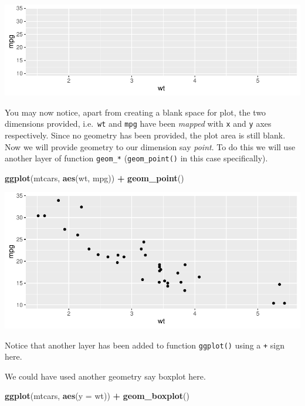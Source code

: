 \documentclass[
]{book}
\newenvironment{Shaded}{\begin{snugshade}}{\end{snugshade}}
\newcommand{\AttributeTok}[1]{\textcolor[rgb]{0.13,0.29,0.53}{#1}}
\newcommand{\FunctionTok}[1]{\textcolor[rgb]{0.13,0.29,0.53}{\textbf{#1}}}
\newcommand{\NormalTok}[1]{#1}
\newcommand{\SpecialCharTok}[1]{\textcolor[rgb]{0.81,0.36,0.00}{\textbf{#1}}}
\begin{document}
\begin{center}\includegraphics{DauR_files/figure-latex/fig_gg_2-1} \end{center}

You may now notice, apart from creating a blank space for plot, the two dimensions provided, i.e.~\texttt{wt} and \texttt{mpg} have been \emph{mapped} with \texttt{x} and \texttt{y} axes respectively. Since no geometry has been provided, the plot area is still blank. Now we will provide geometry to our dimension say \emph{point}. To do this we will use another layer of function \texttt{geom\_*} (\texttt{geom\_point()} in this case specifically).

\begin{Shaded}
\begin{Highlighting}[]
\FunctionTok{ggplot}\NormalTok{(mtcars, }\FunctionTok{aes}\NormalTok{(wt, mpg)) }\SpecialCharTok{+}
  \FunctionTok{geom\_point}\NormalTok{()}
\end{Highlighting}
\end{Shaded}

\begin{center}\includegraphics{DauR_files/figure-latex/fig_3-1} \end{center}

Notice that another layer has been added to function \texttt{ggplot()} using a \texttt{+} sign here.

We could have used another geometry say boxplot here.

\begin{Shaded}
\begin{Highlighting}[]
\FunctionTok{ggplot}\NormalTok{(mtcars, }\FunctionTok{aes}\NormalTok{(}\AttributeTok{y =}\NormalTok{ wt)) }\SpecialCharTok{+}
  \FunctionTok{geom\_boxplot}\NormalTok{()}
\end{Highlighting}
\end{Shaded}
\end{document}
